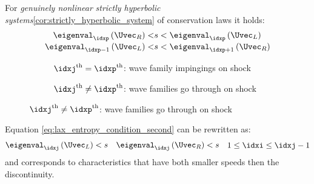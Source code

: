 \begin{propositionbox}\nospacing
    \begin{proposition}\label{proposition:lax_entropy_condition}
        For \textit{genuinely nonlinear} \textit{strictly hyperbolic systems}\cref{cor:strictly_hyperbolic_system} of conservation laws it holds:
        \begin{align}
            \eigenval_{\idxp}\left(\Uvec_{R}\right)<&s<\eigenval_{\idxp}\left(\Uvec_{L}\right)\label{eq:lax_entropy_condition_first}\\[-1\jot]
          \eigenval_{\idxp-1}\left(\Uvec_{L}\right)<&s<\eigenval_{\idxp+1}\left(\Uvec_{R}\right)\label{eq:lax_entropy_condition_second}
        \end{align}
        \begin{figure}[H]
            \centering
            \begin{subfigure}{.45\columnwidth}
                \centering{
                  \def\svgwidth{100pt}
                  \resizebox{\linewidth}{!}{}
                }
                \vspace{-1em}
                \caption{$\idxj^{\text{th}}=\idxp^{\text{th}}$: wave family impingings on shock}
                \label{figure:gnl_entrop_solution_pth_wave}
            \end{subfigure}%
            \hfil
            \begin{subfigure}{.45\columnwidth}
                \centering{
                  \def\svgwidth{100pt}
                  \resizebox{\linewidth}{!}{}
                }
                \vspace{-1em}
                \caption{$\idxj^{\text{th}}\neq\idxp^{\text{th}}$: wave families go through on shock}
                \label{figure:gnl_entrop_solution_not_pth_wave}
            \end{subfigure}
        \end{figure}
    \end{proposition}
\end{propositionbox}
\begin{corbox}\nospacing
    \begin{cor}
        Equation \cref{eq:lax_entropy_condition_second} can be rewritten as:
        \begin{align}
          \begin{aligned}
            \eigenval_{\idxj}\left(\Uvec_{L}\right)<s&&
            \eigenval_{\idxj}\left(\Uvec_{R}\right)<s
          \end{aligned}&&1\leq\idxi\leq\idxj-1
        \end{align}
        and corresponds to characteristics that have both smaller speeds then the discontinuity.
    \end{cor}
\end{corbox}
